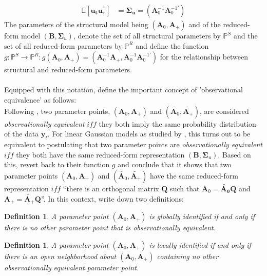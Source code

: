 \documentclass[a4paper,11pt,listof=nochaptergap,oneside,pointednumbers,bibtotoc,bigheadings,liststotoc]{scrbook}
\theoremstyle{mysatz}
\theoremstyle{mydefinition}
\newtheorem{defi}[satz]{Definition}
\theoremstyle{mybemerkung}
\newcommand{\vect}[1]{\boldsymbol{\mathbf{#1}}}
\begin{document}
\begin{itemize}
\begin{equation}
	\begin{split}
		\mathbb{E}[\vect{u_t}\vect{u_{\tau}^'}] & = 
      												\vect{\Sigma_u} = (\vect{A}_0^{-1}\vect{A}_0^{-1'})
	\end{split}								
	\end{equation}	
The parameters of the structural model being $(\vect{A}_0, \vect{A}_+)$ and of the reduced-form model $(\vect{B}, \vect{\Sigma}_u)$, \citet{rubioetal:10} denote the set of all structural parameters by $\mathbb{P}^S$ and the set of all reduced-form parameters by $\mathbb{P}^R$ and define the function $g: \mathbb{P}^S \to \mathbb{P}^R: g(\vect{A}_0, \vect{A}_+) = (\vect{A}_0^{-1}\vect{A}_+, \vect{A}_0^{-1}\vect{A}_0^{-1'})$ for the relationship between structural and reduced-form parameters.\\
\\
Equipped with this notation, \citet{rubioetal:10} define the important concept of 'observational equivalence' as follows: \\
Following \citet{rothenberg:71}, two parameter points, $(\vect{A}_0, \vect{A}_+)$ and $(\widetilde{\vect{A}_0}, \widetilde{\vect{A}_+})$, are considered \textit{observationally equivalent} $iff$ they both imply the same probability distribution of the data $\vect{y}_t$. For linear Gaussian models as studied by \citet{rubioetal:10}, this turns out to be equivalent to postulating that two parameter points are \textit{observationally equivalent} $iff$ they both have the same reduced-form representation $(\vect{B}, \vect{\Sigma}_u)$. Based on this, \citet{rubioetal:10} revert back to their function $g$ and conclude that it shows that two parameter points $(\vect{A}_0, \vect{A}_+)$ and $(\widetilde{\vect{A}_0}, \widetilde{\vect{A}_+})$ have the same reduced-form representation $iff$ ``there is an orthogonal matrix $\vect{Q}$ such that $\vect{A}_0 = \vect{\widetilde{\vect{A}_0}}\vect{Q}$ and $\vect{A}_+ = \widetilde{\vect{A}_+} \vect{Q}$''. In this context, \citet{rubioetal:10} write down two definitions:\\
\begin{defi}
A parameter point $(\vect{A}_0, \vect{A}_+)$ is globally identified if and only if there is no other parameter point that is observationally equivalent.
\end{defi}
\begin{defi}
A parameter point $(\vect{A}_0, \vect{A}_+)$ is locally identified if and only if there is an open neighborhood about $(\vect{A}_0, \vect{A}_+)$ containing no other observationally equivalent parameter point.
\end{defi}


\end{itemize}
\end{document}
